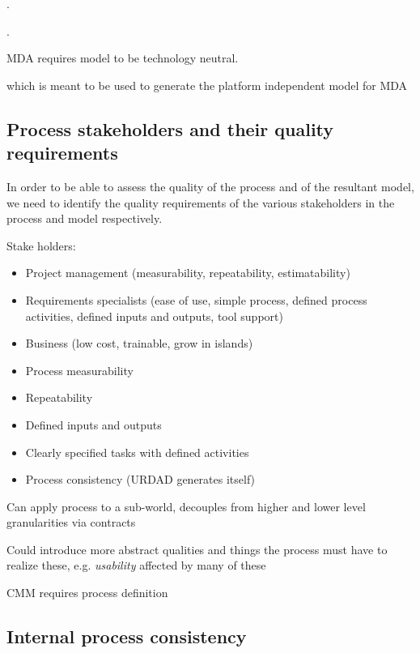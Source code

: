 \begin{tabular}

\cite{lange_christiaan_assessing_2007}. 



\cite{lange_managing_2005,lange_improving_2006}.


MDA requires model to be technology neutral.


which is meant to be used to generate the platform independent model for MDA

\subsection{Process stakeholders and their quality requirements}

In order to be able to assess the quality of the process and of the resultant model, we need to identify the quality requirements of the various stakeholders in the process and model respectively.


\cite{berard_what_1995}

Stake holders:
\begin{itemize}
  \item Project management (measurability, repeatability, estimatability)
  \item Requirements specialists (ease of use, simple process, defined process activities, defined inputs and outputs, tool support)
  \item Business (low cost, trainable, grow in islands)
\end{itemize}


\begin{itemize}
  \item Process measurability
  \item Repeatability
  \item Defined inputs and outputs
  \item Clearly specified tasks with defined activities
  \item Process consistency (URDAD generates itself)
\end{itemize}

Can apply process to a sub-world, decouples from higher and lower level granularities via contracts

Could introduce more abstract qualities and things the process must have to realize these, e.g. \emph{usability} affected by many of these

CMM requires process definition


\subsection{Internal process consistency}


\end{tabular}
